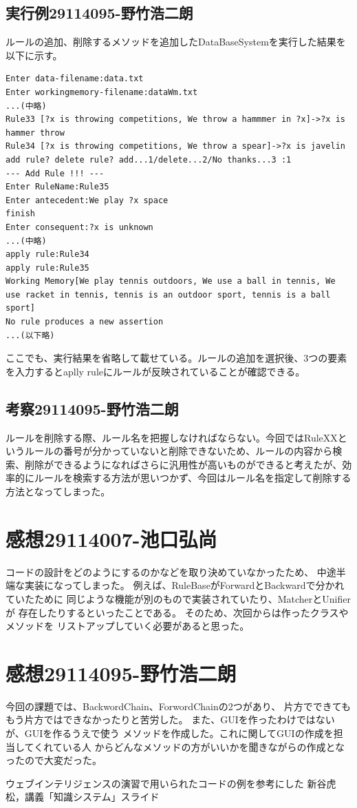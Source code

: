 \documentclass{jarticle}
\begin{document}
\subsection{実行例29114095-野竹浩二朗}
ルールの追加、削除するメソッドを追加したDataBaseSystemを実行した結果を以下に示す。
\begin{lstlisting}
Enter data-filename:data.txt
Enter workingmemory-filename:dataWm.txt
...(中略)
Rule33 [?x is throwing competitions, We throw a hammmer in ?x]->?x is hammer throw
Rule34 [?x is throwing competitions, We throw a spear]->?x is javelin
add rule? delete rule? add...1/delete...2/No thanks...3 :1
--- Add Rule !!! ---
Enter RuleName:Rule35
Enter antecedent:We play ?x space
finish
Enter consequent:?x is unknown
...(中略)
apply rule:Rule34
apply rule:Rule35
Working Memory[We play tennis outdoors, We use a ball in tennis, We use racket in tennis, tennis is an outdoor sport, tennis is a ball sport]
No rule produces a new assertion
...(以下略)
\end{lstlisting}
ここでも、実行結果を省略して載せている。ルールの追加を選択後、3つの要素を入力するとaplly ruleにルールが反映されていることが確認できる。
\subsection{考察29114095-野竹浩二朗}
ルールを削除する際、ルール名を把握しなければならない。今回ではRuleXXというルールの番号が分かっていないと削除できないため、ルールの内容から検索、削除ができるようになればさらに汎用性が高いものができると考えたが、効率的にルールを検索する方法が思いつかず、今回はルール名を指定して削除する方法となってしまった。

\section{感想29114007-池口弘尚}
コードの設計をどのようにするのかなどを取り決めていなかったため、
中途半端な実装になってしまった。
例えば、RuleBaseがForwardとBackwardで分かれていたために
同じような機能が別のもので実装されていたり、MatcherとUnifierが
存在したりするといったことである。
そのため、次回からは作ったクラスやメソッドを
リストアップしていく必要があると思った。
\section{感想29114095-野竹浩二朗}
今回の課題では、BackwordChain、ForwordChainの2つがあり、
片方でできてももう片方ではできなかったりと苦労した。
また、GUIを作ったわけではないが、GUIを作るうえで使う
メソッドを作成した。これに関してGUIの作成を担当してくれている人
からどんなメソッドの方がいいかを聞きながらの作成となったので大変だった。

\begin{thebibliography}{99}
     ウェブインテリジェンスの演習で用いられたコードの例を参考にした
     新谷虎松，講義「知識システム」スライド
\end{thebibliography}
\end{document}

